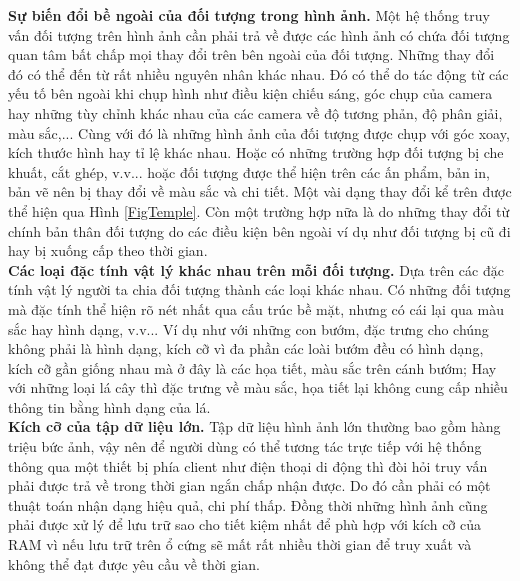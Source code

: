  \textbf{Sự biến đổi bề ngoài của đối tượng trong hình ảnh.} Một hệ thống truy vấn đối tượng trên hình ảnh cần phải trả về được các hình ảnh có chứa đối tượng quan tâm bất chấp mọi thay đổi trên bên ngoài của đối tượng. Những thay đổi đó có thể đến từ rất nhiều nguyên nhân khác nhau. Đó có thể do tác động từ các yếu tố bên ngoài khi chụp hình như điều kiện chiếu sáng, góc chụp của camera hay những tùy chỉnh khác nhau của các camera về độ tương phản, độ phân giải, màu sắc,... Cùng với đó là những hình ảnh của đối tượng được chụp với góc xoay, kích thước hình hay tỉ lệ khác nhau. Hoặc có những trường hợp đối tượng bị che khuất, cắt ghép, v.v... hoặc đối tượng được thể hiện trên các ấn phẩm, bản in, bản vẽ nên bị thay đổi về màu sắc và chi tiết. Một vài dạng thay đổi kể trên được thể hiện qua Hình \ref{FigTemple}. Còn một trường hợp nữa là do những thay đổi từ chính bản thân đối tượng do các điều kiện bên ngoài ví dụ như đối tượng bị cũ đi hay bị xuống cấp theo thời gian.\\ 
 \textbf{Các loại đặc tính vật lý khác nhau trên mỗi đối tượng.} Dựa trên các đặc tính vật lý người ta chia đối tượng thành các loại khác nhau. Có những đối tượng mà đặc tính thể hiện rõ nét nhất qua cấu trúc bề mặt, nhưng có cái lại qua màu sắc hay hình dạng, v.v... Ví dụ như với những con bướm, đặc trưng cho chúng không phải là hình dạng, kích cỡ vì đa phần các loài bướm đều có hình dạng, kích cỡ gần giống nhau mà ở đây là các họa tiết, màu sắc trên cánh bướm; Hay với những loại lá cây thì đặc trưng về màu sắc, họa tiết lại không cung cấp nhiều thông tin bằng hình dạng của lá.\\
 \textbf{Kích cỡ của tập dữ liệu lớn.} Tập dữ liệu hình ảnh lớn thường bao gồm hàng triệu bức ảnh, vậy nên để người dùng có thể tương tác trực tiếp với hệ thống thông qua một thiết bị phía client như điện thoại di động thì đòi hỏi truy vấn phải được trả về trong thời gian ngắn chấp nhận được. Do đó cần phải có một thuật toán nhận dạng hiệu quả, chi phí thấp. Đồng thời những hình ảnh cũng phải được xử lý để lưu trữ sao cho tiết kiệm nhất để phù hợp với kích cỡ của RAM vì nếu lưu trữ trên ổ cứng sẽ mất rất nhiều thời gian để truy xuất và không thể đạt được yêu cầu về thời gian.\\

